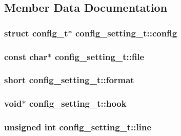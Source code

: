 \subsection{Member Data Documentation}
\hypertarget{structconfig__setting__t_a8d6d8450cc6e3485d9f2da3302c231f4}{
\subsubsection[{config}]{\setlength{\rightskip}{0pt plus 5cm}struct {\bf config\_\-t}$\ast$ {\bf config\_\-setting\_\-t::config}}}
\label{structconfig__setting__t_a8d6d8450cc6e3485d9f2da3302c231f4}
\hypertarget{structconfig__setting__t_af28d89c366212409e49f5dd52c9b7240}{
\subsubsection[{file}]{\setlength{\rightskip}{0pt plus 5cm}const char$\ast$ {\bf config\_\-setting\_\-t::file}}}
\label{structconfig__setting__t_af28d89c366212409e49f5dd52c9b7240}
\hypertarget{structconfig__setting__t_a8957b2dcbf59fcfd00a3abe41bd0d7b5}{
\subsubsection[{format}]{\setlength{\rightskip}{0pt plus 5cm}short {\bf config\_\-setting\_\-t::format}}}
\label{structconfig__setting__t_a8957b2dcbf59fcfd00a3abe41bd0d7b5}
\hypertarget{structconfig__setting__t_aa8238d7d2cc16b51eac47e82867494a5}{
\subsubsection[{hook}]{\setlength{\rightskip}{0pt plus 5cm}void$\ast$ {\bf config\_\-setting\_\-t::hook}}}
\label{structconfig__setting__t_aa8238d7d2cc16b51eac47e82867494a5}
\hypertarget{structconfig__setting__t_a11fc7f855c8200ea53458451d0ef0e9c}{
\subsubsection[{line}]{\setlength{\rightskip}{0pt plus 5cm}unsigned int {\bf config\_\-setting\_\-t::line}}}
